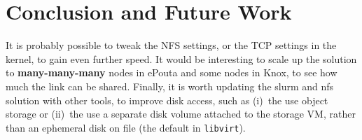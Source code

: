 \section{Conclusion and Future Work}
\label{section:conclusion}
%
It is probably possible to tweak the NFS settings, or the TCP settings
in the kernel, to gain even further speed.
%
It would be interesting to scale up the solution to
\textbf{many-many-many} nodes in ePouta and some nodes in Knox, to see
how much the link can be shared.
%
Finally, it is worth updating the slurm and nfs solution with other
tools, to improve disk access, such as (i)~the use object storage or
(ii)~the use a separate disk volume attached to the storage VM, rather
than an ephemeral disk on file (\ie the default in \texttt{libvirt}).

